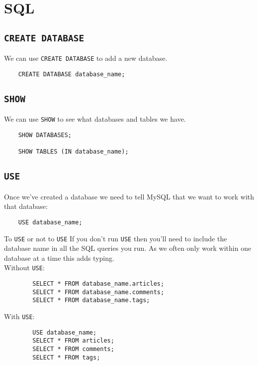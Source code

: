 \pagebreak

\section{SQL}

\subsection{\texttt{CREATE DATABASE}}

We can use \texttt{CREATE DATABASE} to add a new database.

\begin{verbatim}
    CREATE DATABASE database_name;
\end{verbatim}

\subsection{\texttt{SHOW}}

We can use \texttt{SHOW} to see what databases and tables we have.

\begin{verbatim}
    SHOW DATABASES;

    SHOW TABLES (IN database_name);
\end{verbatim}

\subsection{\texttt{USE}}

Once we've created a database we need to tell MySQL that we want to work with that database:

\begin{verbatim}
    USE database_name;
\end{verbatim}

\begin{infobox}{To \texttt{USE} or not to \texttt{USE}}
    If you don't run \texttt{USE} then you'll need to include the database name in all the SQL queries you run. As we often only work within one database at a time this adds typing.
    \\

    Without \texttt{USE}:

    \begin{verbatim}
        SELECT * FROM database_name.articles;
        SELECT * FROM database_name.comments;
        SELECT * FROM database_name.tags;
    \end{verbatim}


    With \texttt{USE}:

    \begin{verbatim}
        USE database_name;
        SELECT * FROM articles;
        SELECT * FROM comments;
        SELECT * FROM tags;
    \end{verbatim}
\end{infobox}

